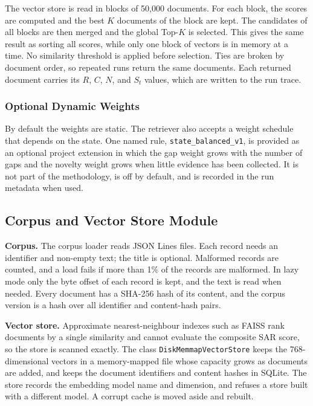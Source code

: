 \documentclass[12pt,a4paper]{report}
\begin{document}
The vector store is read in blocks of 50,000 documents. For each block, the scores are computed and the best $K$ documents of the block are kept. The candidates of all blocks are then merged and the global Top-$K$ is selected. This gives the same result as sorting all scores, while only one block of vectors is in memory at a time. No similarity threshold is applied before selection. Ties are broken by document order, so repeated runs return the same documents. Each returned document carries its $R$, $C$, $N$, and $S_t$ values, which are written to the run trace.

\subsubsection{Optional Dynamic Weights}

By default the weights are static. The retriever also accepts a weight schedule that depends on the state. One named rule, \texttt{state\_balanced\_v1}, is provided as an optional project extension in which the gap weight grows with the number of gaps and the novelty weight grows when little evidence has been collected. It is not part of the methodology, is off by default, and is recorded in the run metadata when used.

\subsection{Corpus and Vector Store Module}

\textbf{Corpus.} The corpus loader reads JSON Lines files. Each record needs an identifier and non-empty text; the title is optional. Malformed records are counted, and a load fails if more than 1\% of the records are malformed. In lazy mode only the byte offset of each record is kept, and the text is read when needed. Every document has a SHA-256 hash of its content, and the corpus version is a hash over all identifier and content-hash pairs.

\textbf{Vector store.} Approximate nearest-neighbour indexes such as FAISS \cite{johnson2017billion} rank documents by a single similarity and cannot evaluate the composite SAR score, so the store is scanned exactly. The class \texttt{DiskMemmap\allowbreak VectorStore} keeps the 768-dimensional vectors in a memory-mapped file whose capacity grows as documents are added, and keeps the document identifiers and content hashes in SQLite. The store records the embedding model name and dimension, and refuses a store built with a different model. A corrupt cache is moved aside and rebuilt.
\end{document}
